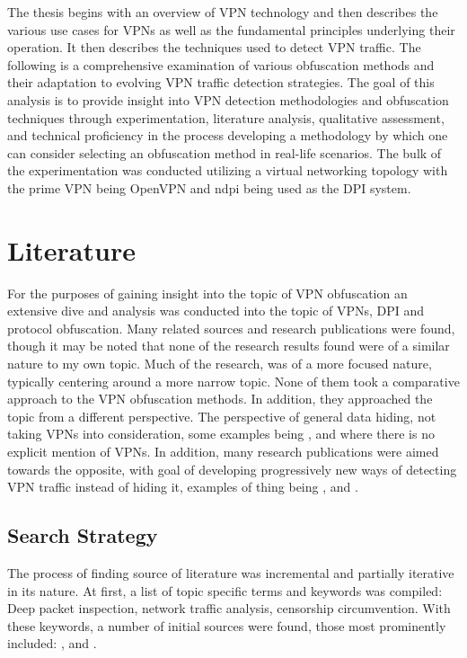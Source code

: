 \documentclass[12pt, fleqn, a4paper]{article}
\begin{document}
The thesis begins with an overview of VPN technology and then describes the various use cases for VPNs as well as the fundamental principles underlying their operation. It then describes the techniques used to detect VPN traffic. The following is a comprehensive examination of various obfuscation methods and their adaptation to evolving VPN traffic detection strategies. The goal of this analysis is to provide insight into VPN detection methodologies and obfuscation techniques through experimentation, literature analysis, qualitative assessment, and technical proficiency in the process developing a methodology by which one can consider selecting an obfuscation method in real-life scenarios. The bulk of the experimentation was conducted utilizing a virtual networking topology with the prime VPN being OpenVPN and ndpi being used as the DPI system.

\section{Literature}
For the purposes of gaining insight into the topic of VPN obfuscation an extensive dive and analysis was conducted into the topic of VPNs, DPI and protocol obfuscation. Many related sources and research publications were found, though it may be noted that none of the research results found were of a similar nature to my own topic. Much of the research, was of a more focused nature, typically centering around a more narrow topic. None of them took a comparative approach to the VPN obfuscation methods. In addition, they approached the topic from a different perspective. The perspective of general data hiding, not taking VPNs into consideration, some examples being \cite{Geneva}, \cite{Stega} and \cite{symtcp} where there is no explicit mention of VPNs. In addition, many research publications were aimed towards the opposite, with goal of developing progressively new ways of detecting VPN traffic instead of hiding it, examples of thing being \cite{detection1}, \cite{detection2} and \cite{detection3}.

\subsection{Search Strategy}
The process of finding source of literature was incremental and partially iterative in its nature. At first, a list of topic specific terms and keywords was compiled: Deep packet inspection, network traffic analysis, censorship circumvention. 
With these keywords, a number of initial sources were found, those most prominently included: \cite{Geneva}, \cite{gohop} and \cite{DPL}.
\end{document}
